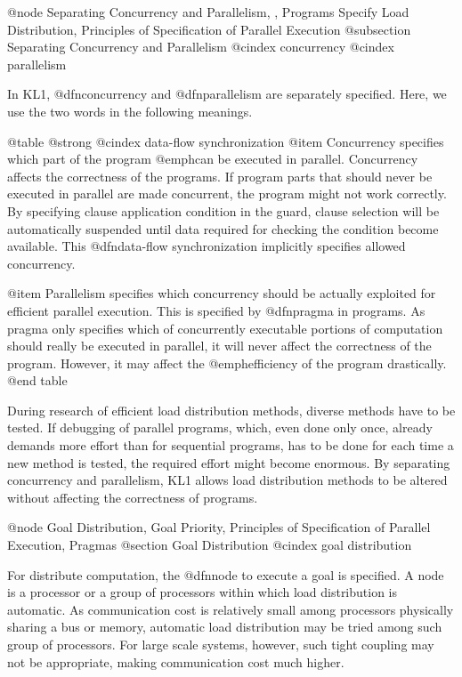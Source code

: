 {@node Separating Concurrency and Parallelism,  , Programs Specify Load Distribution, Principles of Specification of Parallel Execution
@subsection Separating Concurrency and Parallelism
@cindex concurrency
@cindex parallelism

In KL1, @dfn{concurrency} and @dfn{parallelism} are separately
specified.  Here, we use the two words in the following meanings.

@table @strong
@cindex data-flow synchronization
@item Concurrency
specifies which part of the program @emph{can} be executed in parallel.
Concurrency affects the correctness of the programs.  If program parts
that should never be executed in parallel are made concurrent, the
program might not work correctly.  By specifying clause application
condition in the guard, clause selection will be automatically suspended
until data required for checking the condition become available.  This
@dfn{data-flow synchronization} implicitly specifies allowed
concurrency.

@item Parallelism
specifies which concurrency should be actually exploited for efficient
parallel execution.  This is specified by @dfn{pragma} in programs.  As
pragma only specifies which of concurrently executable portions of
computation should really be executed in parallel, it will never affect
the correctness of the program.  However, it may affect the
@emph{efficiency} of the program drastically.
@end table

During research of efficient load distribution methods, diverse methods
have to be tested.  If debugging of parallel programs, which, even done
only once, already demands more effort than for sequential programs, has
to be done for each time a new method is tested, the required effort
might become enormous.  By separating concurrency and parallelism, KL1
allows load distribution methods to be altered without affecting the
correctness of programs.

@node Goal Distribution, Goal Priority, Principles of Specification of Parallel Execution, Pragmas
@section Goal Distribution
@cindex goal distribution

For distribute computation, the @dfn{node} to execute a goal is
specified.  A node is a processor or a group of processors within which
load distribution is automatic.  As communication cost is relatively
small among processors physically sharing a bus or memory, automatic
load distribution may be tried among such group of processors.  For
large scale systems, however, such tight coupling may not be
appropriate, making communication cost much higher.

}
